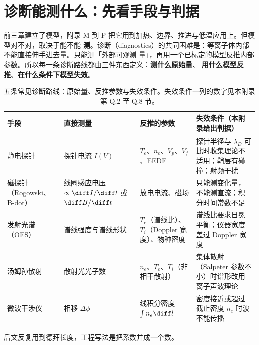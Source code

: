 
\section{诊断能测什么：先看手段与判据}
\label{sec:app-q-map}

前三章建立了模型，附录 M 到 P 把它用到加热、边界、推进与低温应用上。但模型对不对，取决于能不能
\textbf{测}。诊断（diagnostics）的共同困难是：等离子体内部不能直接伸手进去量。只能测「外部可观测
量」，再用一个已标定的模型反推内部参数。所以每一条诊断路线都由三件东西定义：\textbf{测什么原始量}、
\textbf{用什么模型反推}、\textbf{在什么条件下模型失效}。

\begin{table}[htbp]
  \centering
  \caption{五条常见诊断路线：原始量、反推参数与失效条件。失效条件一列的数字见本附录第 Q.2 至 Q.8 节。}
  \label{tab:app-q-map}
  \begin{tabular}{@{}p{2.6cm}p{3.2cm}p{4.4cm}p{5.2cm}@{}}
    \toprule
    手段 & 直接测量 & 反推的参数 & 失效条件（本附录给出判据） \\
    \midrule
    静电探针 & 探针电流 $I(V)$ & $T_e$、$n_e$、$V_p$、$V_f$、EEDF & 探针半径与 $\lambda_D$ 可比时收集理论不适用；鞘层有碰撞；射频干扰 \\
    磁探针（\mbox{Rogowski}、B-dot） & 线圈感应电压 $\propto \diff I/\diff t$ 或 $\diff B/\diff t$ & 放电电流、磁场 & 只能测变化量，不能测直流；积分时间常数不足 \\
    发射光谱（OES） & 谱线强度与谱线形状 & $T_e$（谱线比）、$T_i$（Doppler 宽度）、物种密度 & 谱线比要求日冕平衡；仪器宽度盖过 Doppler 宽度 \\
    汤姆孙散射 & 散射光光子数 & $n_e$、$T_e$、$T_i$（非相干散射） & 集体散射（Salpeter 参数不小）时谱形改用离子声波理论 \\
    微波干涉仪 & 相移 $\Delta\phi$ & 线积分密度 $\int n_e \diff l$ & 密度接近或超过截止密度 $n_c$ 时波不能传播 \\
    \bottomrule
  \end{tabular}
\end{table}

后文反复用到德拜长度，工程写法是把系数并成一个数。

